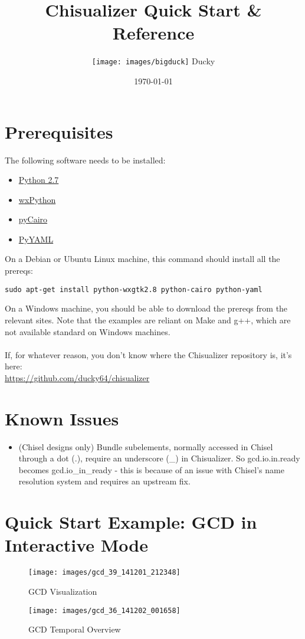 \documentclass[11pt]{article}
\title{\textbf{Chisualizer Quick Start \& Reference}}
\author{\texttt{[image: images/bigduck]} Ducky}
\date{\today}
\begin{document}
\maketitle

\section{Prerequisites}
\label{sec:prereqs}
The following software needs to be installed:
\begin{itemize}
  \item \href{https://www.python.org/download/releases/2.7/}{Python 2.7}
  \item \href{http://wxpython.org/download.php}{wxPython}
  \item \href{http://cairographics.org/pycairo/}{pyCairo}
  \item \href{http://pyyaml.org/wiki/PyYAML}{PyYAML}
\end{itemize}

On a Debian or Ubuntu Linux machine, this command should install all the prereqs:
\begin{verbatim}
sudo apt-get install python-wxgtk2.8 python-cairo python-yaml
\end{verbatim}

On a Windows machine, you should be able to download the prereqs from the relevant sites. Note that the examples are reliant on Make and g++, which are not available standard on Windows machines. \\
\\
If, for whatever reason, you don't know where the Chisualizer repository is, it's here: \\
\url{https://github.com/ducky64/chisualizer}

\section{Known Issues}
\begin{itemize}
  \item (Chisel designs only) Bundle subelements, normally accessed in Chisel through a dot (.), require an underscore (\_) in Chisualizer. So gcd.io.in.ready becomes gcd.io\_in\_ready - this is because of an issue with Chisel's name resolution system and requires an upstream fix.
\end{itemize}

\section{Quick Start Example: GCD in Interactive Mode}
\begin{figure}[h!]
  \centering
    \texttt{[image: images/gcd\_39\_141201\_212348]}
  \caption{GCD Visualization}
\end{figure}
\begin{figure}[h!]
  \centering
    \texttt{[image: images/gcd\_36\_141202\_001658]}
  \caption{GCD Temporal Overview}
\end{figure}
\end{document}
